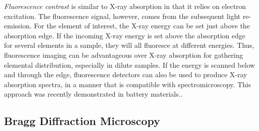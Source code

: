 \documentclass[journal=cmatex,manuscript=perspective]{achemso}
\begin{document}
\emph{Fluorescence contrast} is similar to X-ray absorption in that it
relies on electron excitation. The fluorescence signal, however, comes
from the subsequent light re-emission. For the element of interest,
the X-ray energy can be set just above the absorption edge. If the
incoming X-ray energy is set above the absorption edge for several
elements in a sample, they will all fluoresce at different
energies. Thus, fluorescence imaging can be advantageous over X-ray
absorption for gathering elemental distribution, especially in dilute
samples. If the energy is scanned below and through the edge,
fluorescence detectors can also be used to produce X-ray absorption
spectra, in a manner that is compatible with spectromicroscopy. This
approach was recently demonstrated in battery
materials.\cite{chueh2015}.

\subsection{Bragg Diffraction Microscopy}
\end{document}
